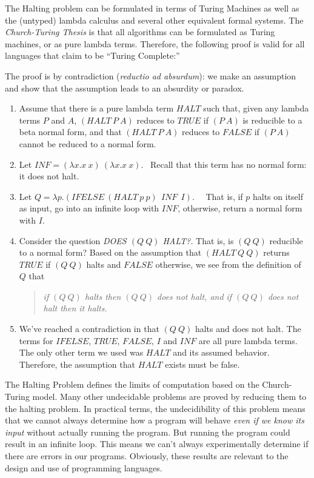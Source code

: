 The Halting problem can be formulated in terms of Turing Machines as well
as the (untyped) lambda calculus and several other equivalent formal systems.
The {\em Church-Turing Thesis\/} is that all algorithms can be formulated as
Turing machines, or as pure lambda terms.  Therefore, the following proof is
valid for all languages that claim to be ``Turing Complete:''

The proof is by contradiction ({\em reductio ad absurdum\/}): we make an assumption and show that the assumption
leads to an absurdity or paradox.
\begin{enumerate}
\item  Assume that there is a pure lambda term $HALT$ such that, given any
  lambda terms $P$ and $A$, $(HALT ~P~A)$ reduces to $TRUE$ if $(P~A)$ is
  reducible to a beta normal form, and that $(HALT ~P~A)$ reduces to $FALSE$ if
  $(P~A)$ cannot be reduced to a normal form.
\item Let $INF = (\lambda x.x~x)~(\lambda x.x~x)$. \  Recall that this term has no
  normal form: it does not halt.
\item Let $Q = \lambda p. (IFELSE~(HALT~p~p) ~~INF~~ I)$. \ \
  That is, if $p$ halts on itself as input, go into an infinite loop with $INF$, otherwise, return a normal form with $I$. 

\item Consider the question {\em DOES $(Q ~Q)$ HALT?.\/}  That is, is
  $(Q~Q)$ reducible to a normal form?  Based on the assumption that
  $(HALT~ Q~Q)$ returns $TRUE$ if $(Q~Q)$ halts and $FALSE$ otherwise,
  we see from the definition of $Q$ that
  \begin{quote}
    {\em if $(Q~Q)$ halts then $(Q~Q)$ does not halt, and if $(Q~Q)$ does not
      halt then it halts.\/}
    \end{quote}
\item We've reached a contradiction in that $(Q~Q)$ halts and does not halt.  
  The terms for $IFELSE$, $TRUE$, $FALSE$, $I$ and $INF$ are all pure lambda terms.
  The only other term we used was $HALT$ and its assumed behavior.  Therefore,
  the assumption that $HALT$ exists must be false.
\end{enumerate}

The Halting Problem defines the limits of computation based on the
Church-Turing model.  Many other undecidable problems are proved by
reducing them to the halting problem.  In practical terms, the
undecidibility of this problem means that we cannot always
determine how a program will behave {\em even if we know its input\/}
without actually running the program. But running the program could
result in an infinite loop.  This means we can't always experimentally
determine if there are errors in our programs.  Obviously,
these results are relevant to the design and use of programming
languages.

